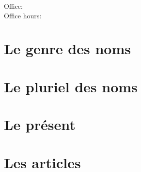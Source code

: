 \documentclass{beamer}
\subtitle[Révision]{La révision}
\begin{document}
  \begin{frame}
    \titlepage
    \tiny{Office: \\
          Office hours: }
  \end{frame}
  
  \begin{frame}
    \hypertarget{début}{}
    \tableofcontents[hideallsubsections]
  \end{frame}

  \section{Le genre des noms}
  \section{Le pluriel des noms}
  \section{Le présent}
  \section{Les articles}
\end{document}
